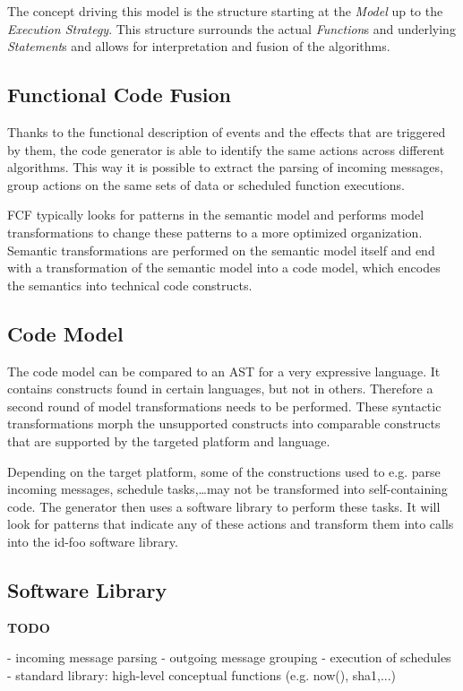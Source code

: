 \documentclass[conference]{IEEEtran}
\newcommand{\TODO}{\textbf{\color{red}TODO}}
\newcommand{\NAME}{id-foo\xspace}
\begin{document}
The concept driving this model is the structure starting at the \emph{Model} up
to the \emph{Execution Strategy}. This structure surrounds the actual
\emph{Function}s and underlying \emph{Statement}s and allows for interpretation
and fusion of the algorithms.

\subsection{Functional Code Fusion}

Thanks to the functional description of events and the effects that are
triggered by them, the code generator is able to identify the same actions
across different algorithms. This way it is possible to extract the parsing of
incoming messages, group actions on the same sets of data or scheduled function
executions.

FCF typically looks for patterns in the semantic model and performs model
transformations to change these patterns to a more optimized organization.
Semantic transformations are performed on the semantic model itself and end
with a transformation of the semantic model into a code model, which encodes
the semantics into technical code constructs.

\subsection{Code Model}

The code model can be compared to an AST for a very expressive language. It
contains constructs found in certain languages, but not in others. Therefore a
second round of model transformations needs to be performed. These syntactic
transformations morph the unsupported constructs into comparable constructs
that are supported by the targeted platform and language.

Depending on the target platform, some of the constructions used to e.g. parse
incoming messages, schedule tasks,\dots may not be transformed into
self-containing code. The generator then uses a software library to perform
these tasks. It will look for patterns that indicate any of these actions and
transform them into calls into the \NAME software library.

\subsection{Software Library}

\TODO

- incoming message parsing
- outgoing message grouping
- execution of schedules
- standard library: high-level conceptual functions (e.g. now(), sha1,...)
\end{document}
